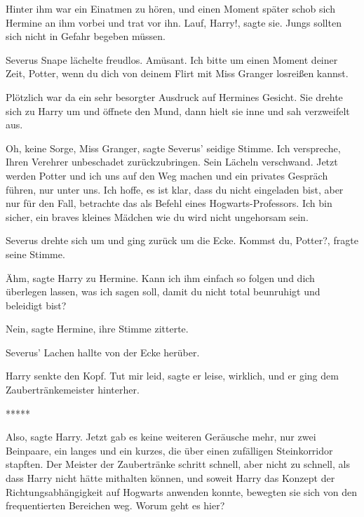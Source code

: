 Hinter ihm war ein Einatmen zu hören, und einen Moment später schob sich Hermine
an ihm vorbei und trat vor ihn. \glqq{}Lauf, Harry!\grqq{}, sagte sie.
\glqq{}Jungs sollten sich nicht in Gefahr begeben müssen.\grqq{}

Severus Snape lächelte freudlos. \glqq{}Amüsant. Ich bitte um einen Moment
deiner Zeit, Potter, wenn du dich von deinem Flirt mit Miss Granger losreißen
kannst.\grqq{}

Plötzlich war da ein sehr besorgter Ausdruck auf Hermines Gesicht. Sie drehte
sich zu Harry um und öffnete den Mund, dann hielt sie inne und sah verzweifelt
aus.

\glqq{}Oh, keine Sorge, Miss Granger\grqq{}, sagte Severus' seidige Stimme.
\glqq{}Ich verspreche, Ihren Verehrer unbeschadet zurückzubringen.\grqq{} Sein
Lächeln verschwand. \glqq{}Jetzt werden Potter und ich uns auf den Weg machen
und ein privates Gespräch führen, nur unter uns. Ich hoffe, es ist klar, dass du
nicht eingeladen bist, aber nur für den Fall, betrachte das als Befehl eines
Hogwarts-Professors. Ich bin sicher, ein braves kleines Mädchen wie du wird
nicht ungehorsam sein.\grqq{}

Severus drehte sich um und ging zurück um die Ecke. \glqq{}Kommst du,
Potter?\grqq{}, fragte seine Stimme.

\glqq{}Ähm\grqq{}, sagte Harry zu Hermine. \glqq{}Kann ich ihm einfach so folgen
und dich überlegen lassen, was ich sagen soll, damit du nicht total beunruhigt
und beleidigt bist?\grqq{}

\glqq{}Nein\grqq{}, sagte Hermine, ihre Stimme zitterte.

Severus' Lachen hallte von der Ecke herüber.

Harry senkte den Kopf. \glqq{}Tut mir leid\grqq{}, sagte er leise, \glqq{}
wirklich\grqq{}, und er ging dem Zaubertränkemeister hinterher.

\begin{center}*****\end{center}

\glqq{}Also\grqq{}, sagte Harry. Jetzt gab es keine weiteren Geräusche mehr, nur
zwei Beinpaare, ein langes und ein kurzes, die über einen zufälligen
Steinkorridor stapften. Der Meister der Zaubertränke schritt schnell, aber nicht
zu schnell, als dass Harry nicht hätte mithalten können, und soweit Harry das
Konzept der Richtungsabhängigkeit auf Hogwarts anwenden konnte, bewegten sie
sich von den frequentierten Bereichen weg. \glqq{}Worum geht es hier?\grqq{}

